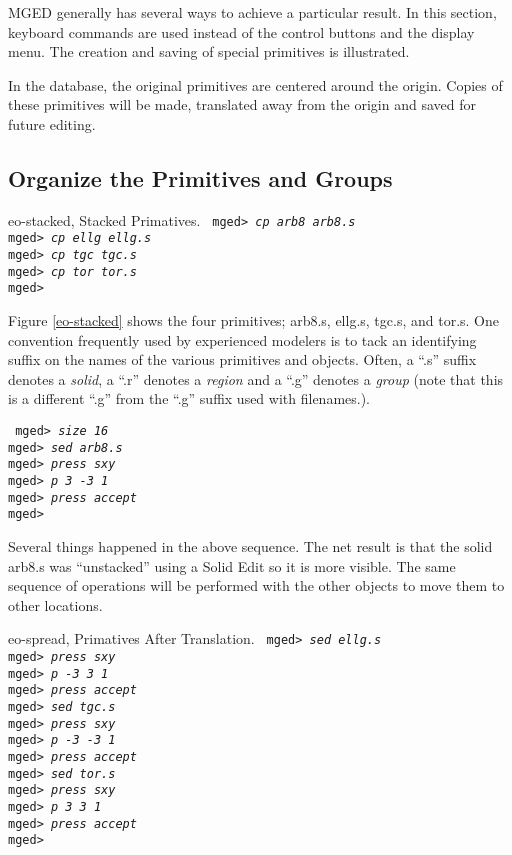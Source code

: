 MGED generally has several ways to achieve a particular result.  In
this section, keyboard commands are used instead of the control buttons and
the display menu.  The creation and saving of special primitives is
illustrated.

In the database, the original primitives are centered around
the origin.  Copies of these primitives will be made, translated away
from the origin and saved for future editing.

\subsection{Organize the Primitives and Groups}

\mfig eo-stacked, Stacked Primatives.
\noindent
{\tt
mged> {\em cp arb8 arb8.s}\\
mged> {\em cp ellg ellg.s}\\
mged> {\em cp tgc tgc.s}\\
mged> {\em cp tor tor.s}\\
mged>\\
}

Figure \ref{eo-stacked} shows the four primitives; arb8.s, ellg.s, tgc.s,
and tor.s.  One convention frequently used by experienced modelers is to
tack an identifying suffix on the names of the various primitives and
objects.  Often, a ``.s'' suffix denotes a {\em solid}, a ``.r'' denotes
a {\em region} and a ``.g'' denotes a {\em group} (note that this is a
different ``.g'' from the ``.g'' suffix used with filenames.).

\noindent
{\tt
mged> {\em size 16}\\
mged> {\em sed arb8.s}\\
mged> {\em press sxy}\\
mged> {\em p 3 -3 1}\\
mged> {\em press accept}\\
mged>\\
}

Several things happened in the above sequence.  The net result is that
the solid arb8.s was ``unstacked'' using a Solid Edit so it is more
visible.  The same sequence of operations will be performed with the
other objects to move them to other locations.

\mfig eo-spread, Primatives After Translation.
\noindent
{\tt
mged> {\em sed ellg.s}\\
mged> {\em press sxy}\\
mged> {\em p -3 3 1}\\
mged> {\em press accept}\\
mged> {\em sed tgc.s}\\
mged> {\em press sxy}\\
mged> {\em p -3 -3 1}\\
mged> {\em press accept}\\
mged> {\em sed tor.s}\\
mged> {\em press sxy}\\
mged> {\em p 3 3 1}\\
mged> {\em press accept}\\
mged>\\
}

